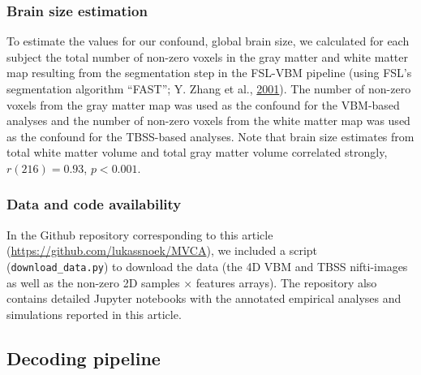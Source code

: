 \documentclass[11pt,american,a4paper,oneside,]{memoir} %
\begin{document}
\hypertarget{confounds-decoding-methods-data-brainsize}{%
\subsubsection{Brain size estimation}\label{confounds-decoding-methods-data-brainsize}}

To estimate the values for our confound, global brain size, we calculated for each subject the total number of non-zero voxels in the gray matter and white matter map resulting from the segmentation step in the FSL-VBM pipeline (using FSL's segmentation algorithm ``FAST''; Y. Zhang et al., \protect\hyperlink{ref-Zhang2001-wa}{2001}). The number of non-zero voxels from the gray matter map was used as the confound for the VBM-based analyses and the number of non-zero voxels from the white matter map was used as the confound for the TBSS-based analyses. Note that brain size estimates from total white matter volume and total gray matter volume correlated strongly, \(r (216) = 0.93\), \(p < 0.001\).

\hypertarget{confounds-decoding-methods-data-data-and-code}{%
\subsubsection{Data and code availability}\label{confounds-decoding-methods-data-data-and-code}}

In the Github repository corresponding to this article (\url{https://github.com/lukassnoek/MVCA}), we included a script (\texttt{download\_data.py}) to download the data (the 4D VBM and TBSS nifti-images as well as the non-zero 2D samples × features arrays). The repository also contains detailed Jupyter notebooks with the annotated empirical analyses and simulations reported in this article.

\hypertarget{confounds-decoding-methods-pipeline}{%
\subsection{Decoding pipeline}\label{confounds-decoding-methods-pipeline}}
\end{document}
